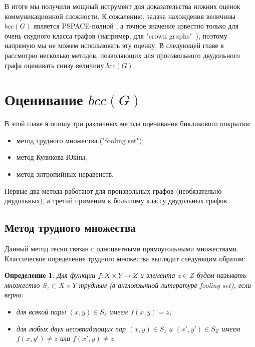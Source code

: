 \documentclass[a4paper]{article}
\newtheorem*{mdefinition}{Определение}
\begin{document}
В итоге мы получили мощный иструмент для доказательства нижних оценок коммуникационной сложности. 
К сожалению, задача нахождения величины $bcc(G)$ является PSPACE-полной \cite{HermannMarkus}, а точное 
значение известно только для очень скудного класса графов (например, для "crown graphs"\ \cite{CrownGraph}), поэтому 
напрямую мы не можем использовать эту оценку. В следующей главе я рассмотрю несколько методов, 
позволяющих для произвольного двудольного графа оценивать снизу величину $bcc(G)$.


\addtocounter{section}{1}
\section*{Оценивание $bcc(G)$}

В этой главе я опишу три различных метода оценивания бикликового покрытия:
\begin{itemize}[noitemsep]
	\item метод трудного множества ("fooling set");
	\item метод Куликова-Юкны;
	\item метод энтропийных неравенств.
\end{itemize}

Первые два метода работают для произвольных графов (необязательно двудольных), а третий применим к 
большому классу двудольных графов.

\setcounter{subsection}{0}

\subsection{Метод трудного множества}

Данный метод тесно связан с одноцветными прямоугольными множествами. Классическое определение 
трудного множества выглядит следующим образом:

\begin{mdefinition}
	Для функции $f: X\times Y \rightarrow Z$ и элемента $z\in Z$ будем называть множество 
	$S_z\subset X\times Y$ трудным (в англоязычной литературе fooling set), если верно:
	\begin{itemize}[noitemsep]
		\item для всякой пары $(x, y)\in S_z$ имеем $f(x, y) = z$;
		\item для любых двух несовпадающих пар $(x, y)\in S_z$ и $(x', y')\in S_Z$ имеем 
		$f(x, y') \neq z$ или $f(x', y) \neq z$.
	\end{itemize}
\end{mdefinition}
\end{document}
